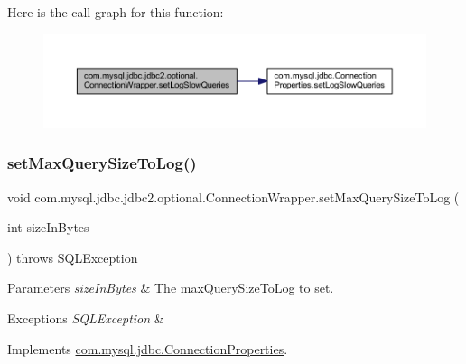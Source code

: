 Here is the call graph for this function\+:
\nopagebreak
\begin{figure}[H]
\begin{center}
\leavevmode
\includegraphics[width=350pt]{classcom_1_1mysql_1_1jdbc_1_1jdbc2_1_1optional_1_1_connection_wrapper_a392f4a58a5aa8c42317181640bdb6575_cgraph}
\end{center}
\end{figure}
\mbox{\label{classcom_1_1mysql_1_1jdbc_1_1jdbc2_1_1optional_1_1_connection_wrapper_ac2fc5533a1f39ec379f5641cd048a91f}} 
\subsubsection{\texorpdfstring{set\+Max\+Query\+Size\+To\+Log()}{setMaxQuerySizeToLog()}}
{\footnotesize\ttfamily void com.\+mysql.\+jdbc.\+jdbc2.\+optional.\+Connection\+Wrapper.\+set\+Max\+Query\+Size\+To\+Log (\begin{DoxyParamCaption}\item[{int}]{size\+In\+Bytes }\end{DoxyParamCaption}) throws S\+Q\+L\+Exception}


\begin{DoxyParams}{Parameters}
{\em size\+In\+Bytes} & The max\+Query\+Size\+To\+Log to set. \\
\hline
\end{DoxyParams}

\begin{DoxyExceptions}{Exceptions}
{\em S\+Q\+L\+Exception} & \\
\hline
\end{DoxyExceptions}


Implements \mbox{\hyperlink{interfacecom_1_1mysql_1_1jdbc_1_1_connection_properties_a65e15e4e1644fe1fb818777977237944}{com.\+mysql.\+jdbc.\+Connection\+Properties}}.

